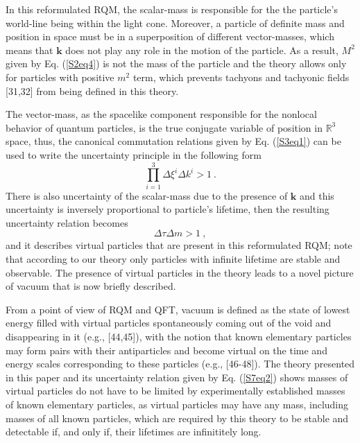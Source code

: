 \documentclass[12pt]{iopart}
\begin{document}
In this reformulated RQM, the scalar-mass is responsible for the the particle's
world-line being within the light cone.  Moreover, a particle of definite mass and 
position in space must be in a superposition of different vector-masses, which 
means that $\boldsymbol{k}$ does not play any role in the motion of the particle.
As a result, $M^2$ given by Eq. (\ref{S2eq4}) is not the mass of the particle and
the theory allows only for particles with positive $m^2$ term, which prevents 
tachyons and tachyonic fields [31,32] from being defined in this theory.

The vector-mass, as the spacelike component responsible for the nonlocal behavior 
of quantum particles, is the true conjugate variable of position in $\mathbb{R}^3$ 
space, thus, the canonical commutation relations given by Eq. (\ref{S3eq1}) can be
used to write the uncertainty principle in the following form
%
    \begin{equation}
	\prod_{i=1}^3 \Delta \xi^{i}\Delta k^{i} > 1\ .
       \label{S7eq1}
	\end{equation}
%
There is also uncertainty of the scalar-mass due to the presence of $\boldsymbol{k}$
and this uncertainty is inversely proportional to particle's lifetime, then the resulting 
uncertainty relation becomes 
%
	\begin{equation}
	\Delta\tau\Delta m > 1\ ,
       \label{S7eq2}
	\end{equation}
%
and it describes virtual particles that are present in this reformulated RQM; note that 
according to our theory only particles with infinite lifetime are stable and observable.
The presence of virtual particles in the theory leads to a novel picture of vacuum 
that is now briefly described.

From a point of view of RQM and QFT, vacuum is defined as the state of lowest energy
filled with virtual particles spontaneously coming out of the void and disappearing in it
(e.g., [44,45]), with the notion that known elementary particles may form pairs with 
their antiparticles and become virtual on the time and energy scales corresponding 
to these particles (e.g., [46-48]).  The theory presented in this paper and its uncertainty
relation given by Eq. (\ref{S7eq2}) shows masses of virtual particles do not have to be 
limited by experimentally established masses of known elementary particles, as virtual
particles may have any mass, including masses of all known particles, which are 
required by this theory to be stable and detectable if, and only if, their lifetimes are 
infinititely long. 
%
\end{document}
